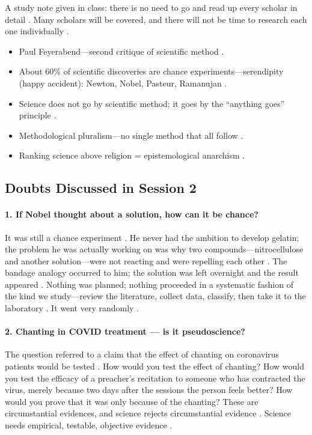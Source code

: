 \begin{CriticalPoint}
A study note given in class: there is no need to go and read up every scholar in detail . Many scholars will be covered, and there will not be time to research each one individually .
\end{CriticalPoint}

\begin{QuickRevision}
\begin{itemize}
    \item Paul Feyerabend---second critique of scientific method .
    \item About 60\% of scientific discoveries are chance experiments---serendipity (happy accident): Newton, Nobel, Pasteur, Ramanujan .
    \item Science does not go by scientific method; it goes by the ``anything goes'' principle .
    \item Methodological pluralism---no single method that all follow .
    \item Ranking science above religion = epistemological anarchism .
\end{itemize}
\end{QuickRevision}

\subsection{Doubts Discussed in Session 2}

\paragraph{1. If Nobel thought about a solution, how can it be chance?}
It was still a chance experiment . He never had the ambition to develop gelatin; the problem he was actually working on was why two compounds---nitrocellulose and another solution---were not reacting and were repelling each other . The bandage analogy occurred to him; the solution was left overnight and the result appeared . Nothing was planned; nothing proceeded in a systematic fashion of the kind we study---review the literature, collect data, classify, then take it to the laboratory . It went very randomly .

\paragraph{2. Chanting in COVID treatment --- is it pseudoscience?}
The question referred to a claim that the effect of chanting on coronavirus patients would be tested . How would you test the effect of chanting?  How would you test the efficacy of a preacher's recitation to someone who has contracted the virus, merely because two days after the sessions the person feels better?  How would you prove that it was only because of the chanting?  These are circumstantial evidences, and science rejects circumstantial evidence . Science needs empirical, testable, objective evidence .

